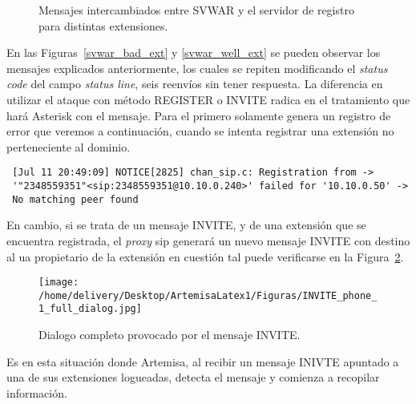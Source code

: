 \documentclass[a4paper,12pt]{report}
\newenvironment{myscriptlisting}
{\begin{list}{}{\setlength{\leftmargin}{1em}}\item\scriptsize\bfseries}
{\end{list}}
\begin{document}
\begin{figure}[h!]
 \centering
 \label{svwar}
 \caption{Mensajes intercambiados entre SVWAR y el servidor de registro 
para distintas extensiones.}
\end{figure}

En las Figuras~\ref{svwar_bad_ext} y \ref{svwar_well_ext} se pueden observar los
 mensajes explicados anteriormente, los cuales se repiten modificando el
\emph{status code} del campo \emph{status line}, seis reenvíos sin tener respuesta.
La diferencia en utilizar el ataque con método REGISTER o INVITE radica en el 
tratamiento que hará Asterisk con el mensaje. Para el primero solamente genera
un registro de error que veremos a continuación, cuando se intenta registrar una
extensión no perteneciente al dominio.
\begin{myscriptlisting}
 \begin{verbatim}
 [Jul 11 20:49:09] NOTICE[2825] chan_sip.c: Registration from ->
 '"2348559351"<sip:2348559351@10.10.0.240>' failed for '10.10.0.50' ->
 No matching peer found 
 \end{verbatim}
\end{myscriptlisting}
En cambio, si se trata de un mensaje INVITE, y de una extensión que se encuentra
 registrada, el \emph{proxy} \ac{sip} generará un nuevo mensaje INVITE con destino al
\ac{ua} propietario de la extensión en cuestión tal puede verificarse en
la Figura~\ref{SVWAR_INVITE_full_dialog}.
          
\begin{figure}[h!] 
\centering
\texttt{[image: /home/delivery/Desktop/ArtemisaLatex1/Figuras/INVITE\_phone\_1\_full\_dialog.jpg]}
\caption{Dialogo completo provocado por el mensaje INVITE.}
\label{SVWAR_INVITE_full_dialog}
\end{figure}
Es en esta situación donde Artemisa, al recibir un mensaje INIVTE apuntado a una
 de sus extensiones logueadas, detecta el mensaje y comienza a recopilar
información.
\end{document}
